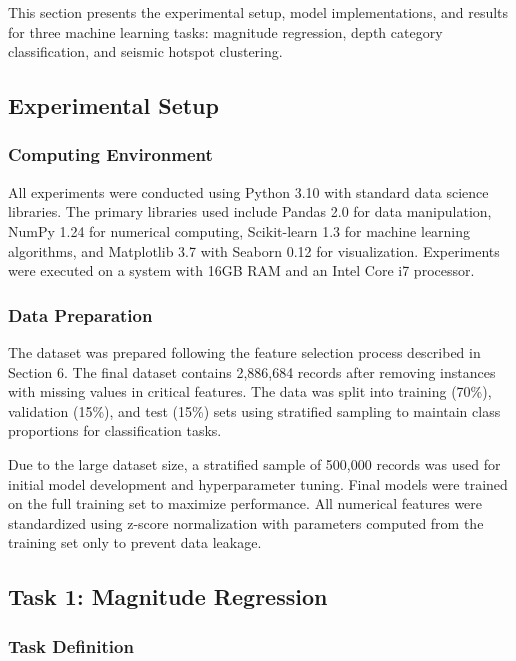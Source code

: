 
This section presents the experimental setup, model implementations, and results for three machine learning tasks: magnitude regression, depth category classification, and seismic hotspot clustering.

\subsection{Experimental Setup}

\subsubsection{Computing Environment}

All experiments were conducted using Python 3.10 with standard data science libraries. The primary libraries used include Pandas 2.0 for data manipulation, NumPy 1.24 for numerical computing, Scikit-learn 1.3 for machine learning algorithms, and Matplotlib 3.7 with Seaborn 0.12 for visualization. Experiments were executed on a system with 16GB RAM and an Intel Core i7 processor.

\subsubsection{Data Preparation}

The dataset was prepared following the feature selection process described in Section 6. The final dataset contains 2,886,684 records after removing instances with missing values in critical features. The data was split into training (70\%), validation (15\%), and test (15\%) sets using stratified sampling to maintain class proportions for classification tasks.

Due to the large dataset size, a stratified sample of 500,000 records was used for initial model development and hyperparameter tuning. Final models were trained on the full training set to maximize performance. All numerical features were standardized using z-score normalization with parameters computed from the training set only to prevent data leakage.

\subsection{Task 1: Magnitude Regression}

\subsubsection{Task Definition}

